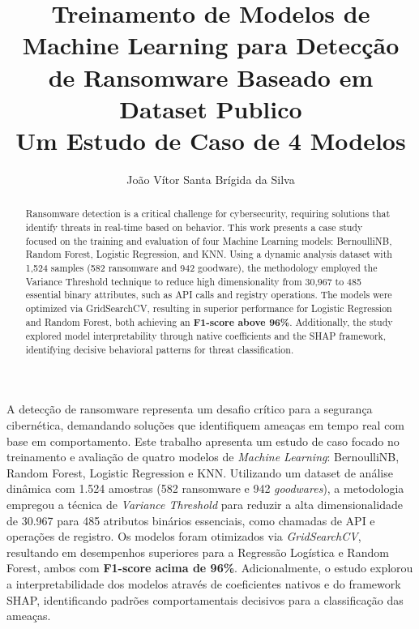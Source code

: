 \documentclass[12pt]{article}
\title{Treinamento de Modelos de Machine Learning para Detecção de Ransomware Baseado em Dataset Publico \\ Um Estudo de Caso de 4 Modelos}
\author{João Vítor Santa Brígida da Silva \inst{1}}
\begin{document}
\maketitle

\begin{abstract}
	
	Ransomware detection is a critical challenge for cybersecurity, requiring solutions that identify threats in real-time based on behavior. This work presents a case study focused on the training and evaluation of four Machine Learning models: BernoulliNB, Random Forest, Logistic Regression, and KNN. Using a dynamic analysis dataset with 1,524 samples (582 ransomware and 942 goodware), the methodology employed the Variance Threshold technique to reduce high dimensionality from 30,967 to 485 essential binary attributes, such as API calls and registry operations. The models were optimized via GridSearchCV, resulting in superior performance for Logistic Regression and Random Forest, both achieving an \textbf{F1-score above 96\%}. Additionally, the study explored model interpretability through native coefficients and the SHAP framework, identifying decisive behavioral patterns for threat classification.
\end{abstract}

\begin{resumo} 
	A detecção de ransomware representa um desafio crítico para a segurança cibernética, demandando soluções que identifiquem ameaças em tempo real com base em comportamento. Este trabalho apresenta um estudo de caso focado no treinamento e avaliação de quatro modelos de \textit{Machine Learning}: BernoulliNB, Random Forest, Logistic Regression e KNN. Utilizando um dataset de análise dinâmica com 1.524 amostras (582 ransomware e 942 \textit{goodwares}), a metodologia empregou a técnica de \textit{Variance Threshold} para reduzir a alta dimensionalidade de 30.967 para 485 atributos binários essenciais, como chamadas de API e operações de registro. Os modelos foram otimizados via \textit{GridSearchCV}, resultando em desempenhos superiores para a Regressão Logística e Random Forest, ambos com \textbf{F1-score acima de 96\%}. Adicionalmente, o estudo explorou a interpretabilidade dos modelos através de coeficientes nativos e do framework SHAP, identificando padrões comportamentais decisivos para a classificação das ameaças.
\end{resumo}











\end{document}

